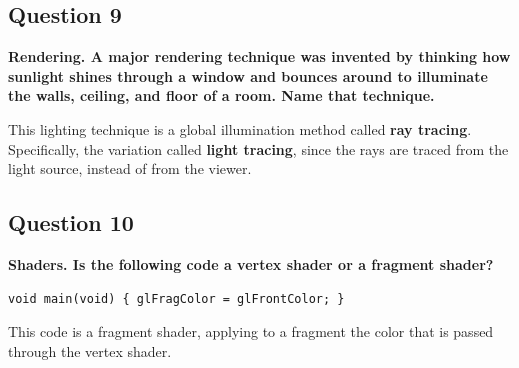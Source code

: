\documentclass[12pt]{article}
\begin{document}
\subsection*{Question 9}
{\bfseries Rendering. A major rendering technique was invented by thinking how sunlight shines through a window and bounces around to illuminate the walls, ceiling, and floor of a room. Name that technique.}

This lighting technique is a global illumination method called \textbf{ray tracing}. Specifically, the variation called \textbf{light tracing}, since the rays are traced from the light source, instead of from the viewer.

\subsection*{Question 10}
{\bfseries Shaders. Is the following code a vertex shader or a fragment shader?
\begin{verbatim}
void main(void) { glFragColor = glFrontColor; }    
\end{verbatim}
}

This code is a fragment shader, applying to a fragment the color that is passed through the vertex shader.
\end{document}
